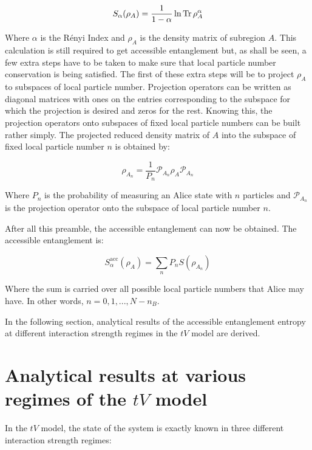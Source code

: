 	
\begin{equation}
 S_{\alpha}(\rho_{A}) = \frac{1}{1-\alpha} \ln{\operatorname{Tr}{\rho_{A}^{\alpha}}} 
\end{equation}

Where $\alpha$ is the R\'enyi Index and $\rho_{A}$ is the density matrix of subregion $A$. This calculation is still required to get accessible entanglement but, as shall be seen, a few extra steps have to be taken to make sure that local particle number conservation is being satisfied. The first of these extra steps will be to project $\rho_{A}$ to subspaces of local particle number. Projection operators can be written as diagonal matrices with ones on the entries corresponding to the subspace for which the projection is desired and zeros for the rest. Knowing this, the projection operators onto subspaces of fixed local particle numbers can be built rather simply. The projected reduced density matrix of  $A$ into the subspace of fixed local particle number $n$ is obtained by:

\begin{equation}
\rho_{A_n} = \frac{1}{P_n} \mathcal{P}_{A_n} \rho_A \mathcal{P}_{A_n}
\label{eq:accessibleEE}
\end{equation}

Where $P_n$ is the probability of measuring an Alice state with $n$ particles and $\mathcal{P}_{A_n}$ is the projection operator onto the subspace of local particle number $n$.

After all this preamble, the accessible entanglement can now be obtained. The accessible entanglement is:

\begin{equation}
S_{\alpha}^{\mathrm{acc}}(\rho_A) = \sum_{n} P_n S(\rho_{A_n}) 
\label{eq:accessibleEE}
\end{equation}

Where the sum is carried over all possible local particle numbers that Alice may have. In other words, $n=0,1,...,N-n_{B}$.

In the following section, analytical results of the accessible entanglement entropy at different interaction strength regimes in the $tV$ model are derived.

\section{Analytical results at various regimes of the $tV$ model}
	In the $tV$ model, the state of the system is exactly known in three different interaction strength regimes:
	
